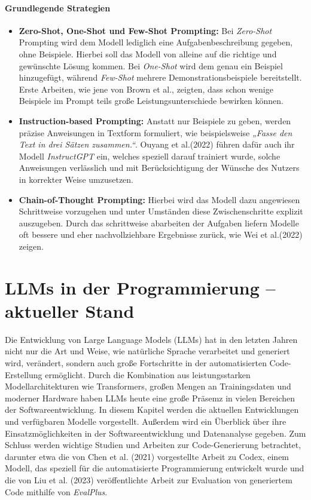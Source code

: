 \documentclass[11pt,a4paper]{article}
\begin{document}
\paragraph{Grundlegende Strategien}
\begin{itemize}
  \item \textbf{Zero-Shot, One-Shot und Few-Shot Prompting:}  
  Bei \emph{Zero-Shot} Prompting wird dem Modell lediglich eine Aufgabenbeschreibung gegeben, ohne Beispiele. Hierbei soll das Modell von alleine auf die richtige und gewünschte Lösung kommen. Bei \emph{One-Shot} wird dem genau ein Beispiel hinzugefügt, während \emph{Few-Shot} mehrere Demonstrationsbeispiele bereitstellt. Erste Arbeiten, wie jene von Brown et al.\cite{brown2020languagemodelsfewshotlearners}, zeigten, dass schon wenige Beispiele im Prompt teils große Leistungsunterschiede bewirken können.

  \item \textbf{Instruction-based Prompting:}  
  Anstatt nur Beispiele zu geben, werden präzise Anweisungen in Textform formuliert, wie beispielsweise \emph{„Fasse den Text in drei Sätzen zusammen.“}. Ouyang et al.(2022) führen dafür auch ihr Modell \emph{InstructGPT} ein, welches speziell darauf trainiert wurde, solche Anweisungen verlässlich und mit Berücksichtigung der Wünsche des Nutzers in korrekter Weise umzusetzen\cite{ouyang2022traininglanguagemodelsfollow}.

  \item \textbf{Chain-of-Thought Prompting:}  
  Hierbei wird das Modell dazu angewiesen Schrittweise vorzugehen und unter Umständen diese Zwischenschritte explizit auszugeben. Durch das schrittweise abarbeiten der Aufgaben liefern Modelle oft bessere und eher nachvollziehbare Ergebnisse zurück, wie Wei et al.(2022) zeigen\cite{wei2023chainofthoughtpromptingelicitsreasoning}.
\end{itemize}


\section{LLMs in der Programmierung – aktueller Stand}
\label{sec:llms_programmierung}
Die Entwicklung von Large Language Models (LLMs) hat in den letzten Jahren nicht nur die Art und Weise, wie natürliche Sprache verarbeitet und generiert wird, verändert, sondern auch große Fortschritte in der automatisierten Code-Erstellung ermöglicht. Durch die Kombination aus leistungsstarken Modellarchitekturen wie Transformers, großen Mengen an Trainingsdaten und moderner Hardware haben LLMs heute eine große Präsemz in vielen Bereichen der Softwareentwicklung.
In diesem Kapitel werden die aktuellen Entwicklungen und verfügbaren Modelle vorgestellt. Außerdem wird ein Überblick über ihre Einsatzmöglichkeiten in der Softwareentwicklung und Datenanalyse gegeben. Zum Schluss werden wichtige Studien und Arbeiten zur Code-Generierung betrachtet, darunter etwa die von Chen et al. (2021) vorgestellte Arbeit zu Codex, einem Modell, das speziell für die automatisierte Programmierung entwickelt wurde\cite{chen2021evaluatinglargelanguagemodels} und die von Liu et al. (2023) veröffentlichte Arbeit zur Evaluation von generiertem Code mithilfe von \emph{EvalPlus}\cite{NEURIPS2023_43e9d647}.
\end{document}
